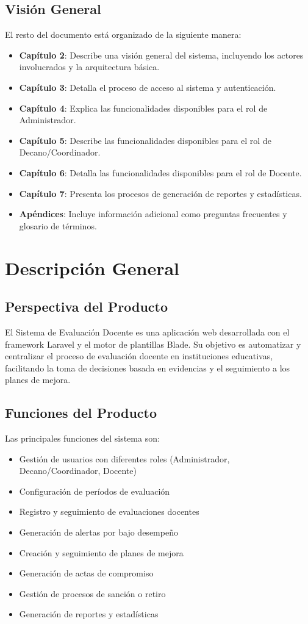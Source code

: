 \documentclass[12pt,a4paper]{book}
\begin{document}
\section{Visión General}
El resto del documento está organizado de la siguiente manera:
\begin{itemize}
    \item \textbf{Capítulo 2}: Describe una visión general del sistema, incluyendo los actores involucrados y la arquitectura básica.
    \item \textbf{Capítulo 3}: Detalla el proceso de acceso al sistema y autenticación.
    \item \textbf{Capítulo 4}: Explica las funcionalidades disponibles para el rol de Administrador.
    \item \textbf{Capítulo 5}: Describe las funcionalidades disponibles para el rol de Decano/Coordinador.
    \item \textbf{Capítulo 6}: Detalla las funcionalidades disponibles para el rol de Docente.
    \item \textbf{Capítulo 7}: Presenta los procesos de generación de reportes y estadísticas.
    \item \textbf{Apéndices}: Incluye información adicional como preguntas frecuentes y glosario de términos.
\end{itemize}

\chapter{Descripción General}
\section{Perspectiva del Producto}
El Sistema de Evaluación Docente es una aplicación web desarrollada con el framework Laravel y el motor de plantillas Blade. Su objetivo es automatizar y centralizar el proceso de evaluación docente en instituciones educativas, facilitando la toma de decisiones basada en evidencias y el seguimiento a los planes de mejora.

\section{Funciones del Producto}
Las principales funciones del sistema son:
\begin{itemize}
    \item Gestión de usuarios con diferentes roles (Administrador, Decano/Coordinador, Docente)
    \item Configuración de períodos de evaluación
    \item Registro y seguimiento de evaluaciones docentes
    \item Generación de alertas por bajo desempeño
    \item Creación y seguimiento de planes de mejora
    \item Generación de actas de compromiso
    \item Gestión de procesos de sanción o retiro
    \item Generación de reportes y estadísticas
\end{itemize}
\end{document}
